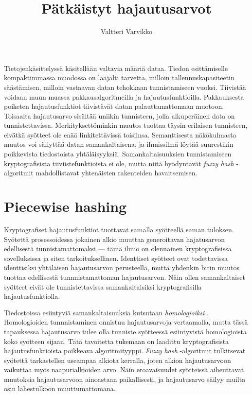 \documentclass[12pt, a4paper]{article}
\title{Pätkäistyt hajautusarvot}
\author{Valtteri Varvikko}
\begin{document}
	\maketitle

	Tietojenkäsittelyssä käsitellään valtavia määriä dataa. Tiedon esittämiselle kompaktimmassa
	muodossa on laajalti tarvetta, milloin tallennuskapasiteetin säästämisen, milloin vastaavan
	datan tehokkaan tunnistamiseen vuoksi. Tiivistää voidaan muun muassa pakkausalgoritmeilla ja
	hajautusfunktioilla. 
	Pakkauksesta poiketen hajautusfunktiot tiivistävät datan palauttamattomaan muotoon.
	Toisaalta hajautusarvo sisältää uniikin tunnisteen, jolla
	alkuperäinen data on tunnistettavissa. Merkityksettöminkin muutos tuottaa täysin erilaisen
	tunnisteen, eivätkä syötteet ole enää linkitettävissä toisiinsa.
	Semanttisesta näkökulmasta muutos voi säilyttää datan samankaltaisena,
	ja ihmissilmä löytää suurestikin poikkevista tiedostoista yhtäläisyyksiä.
	Samankaltaisuuksien tunnistamiseen kryptografisista tiiviistefunktioista ei ole,
	mutta niitä hyödyntävät \textit{fuzzy hash} -algoritmit mahdollistavat
	yhtenäisten rakenteiden havaitsemisen.

	\section*{Piecewise hashing}

	Kryptografiset hajautusfunktiot tuottavat samalla syötteellä saman tuloksen.
	Syötettä prosessoidessa jokainen alkio muuttaa generoitavan hajatusarvon
	edellisestä tunnistamattomaksi --- tämä ilmiö on olennainen kryptografisissa sovelluksissa
	ja siten tarkoituksellinen.
	Identtiset syötteet ovat todettavissa identtisiksi yhtäläisen hajautusarvon
	perusteella, mutta yhdenkin bitin muutos tuottaa edellisestä tunnnistamattoman
	hajautusarvon. Näin ollen samankaltaiset syötteet eivät ole tunnistettavissa
	samankaltaisiksi kryptografisilla hajautusfunktiolla.

	Tiedostoissa esiintyviä samankaltaisuuksia kutsutaan
	\textit{homologioiksi} \parencite{IDENT}. Homologioiden tunnnistaminen onnistuu hajautusarvoja
	vertaamalla, mutta tässä tapauksessa hajautusarvo tulee olla tunniste 
	syötteessä esiintyvistä homologioista koko syötteen sijaan.
	Tätä tavoitetta tukemaan on laadittu kryptografisista hajautusfunktioista
	poikkeava algoritmityyppi. \textit{Fuzzy hash} -algoritmit tulkitsevat
	syötettä tarkastellen useampaa alkiota kerralla, joten alkion
	hajautusarvoon vaikuttaa myös naapurialkioiden arvo. Näin eroavaisuudet
	syötteissä aiheuttavat muutoksia hajautusarvoon ainoastaan paikallisesti,
	ja hajautusarvo säilyy muilta osin lähestulkoon muuttumattomana.
\end{document}
